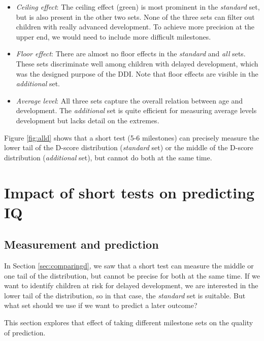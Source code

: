 \documentclass[
]{book}
\begin{document}
\begin{itemize}
\item
  \emph{Ceiling effect}: The ceiling effect (green) is most prominent in the \emph{standard} set, but is also present in the other two sets. None of the three sets can filter out children with really advanced development. To achieve more precision at the upper end, we would need to include more difficult milestones.
\item
  \emph{Floor effect}: There are almost no floor effects in the \emph{standard} and \emph{all} sets. These sets discriminate well among children with delayed development, which was the designed purpose of the DDI. Note that floor effects are visible in the \emph{additional} set.
\item
  \emph{Average level}: All three sets capture the overall relation between age and development. The \emph{additional} set is quite efficient for measuring average levels development but lacks detail on the extremes.
\end{itemize}

Figure \ref{fig:alld} shows that a short test (5-6 milestones) can precisely measure the lower tail of the D-score distribution (\emph{standard} set) or the middle of the D-score distribution (\emph{additional} set), but cannot do both at the same time.

\hypertarget{sec:predictiq}{%
\section{Impact of short tests on predicting IQ}\label{sec:predictiq}}

\hypertarget{measurement-and-prediction}{%
\subsection{Measurement and prediction}\label{measurement-and-prediction}}

In Section \ref{sec:comparingd}, we saw that a short test can measure the middle or one tail of the distribution, but cannot be precise for both at the same time. If we want to identify children at risk for delayed development, we are interested in the lower tail of the distribution, so in that case, the \emph{standard} set is suitable. But what set should we use if we want to predict a later outcome?

This section explores that effect of taking different milestone sets on the quality of prediction.
\end{document}
